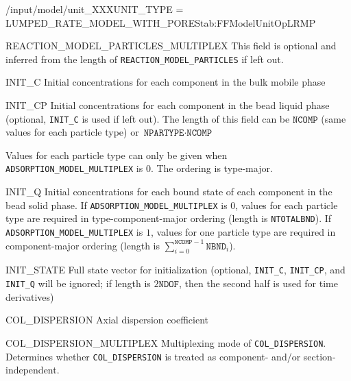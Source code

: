 \begin{condsubgroup}{/input/model/unit\_XXX}{UNIT\_TYPE = LUMPED\_RATE\_MODEL\_WITH\_PORES}{tab:FFModelUnitOpLRMP}
\begin{dataset}[unit=--,type=int,range={$\{0, 1\}$},length={1}]{REACTION\_MODEL\_PARTICLES\_MULTIPLEX}
    This field is optional and inferred from the length of \texttt{REACTION\_MODEL\_PARTICLES} if left out.
  \end{dataset}
  \begin{dataset}[unit=\si{\mol\per\cubic\metre\of{IV}},type=double,range={$\geq 0$},length={\texttt{NCOMP}}]{INIT\_C}
    Initial concentrations for each component in the bulk mobile phase
  \end{dataset}
  \begin{dataset}[unit=\si{\mol\per\cubic\metre\of{MP}},type=double,range={$\geq 0$},length={\texttt{NCOMP} / $\texttt{NPARTYPE} \cdot \texttt{NCOMP}$}]{INIT\_CP}
    Initial concentrations for each component in the bead liquid phase (optional, \texttt{INIT\_C} is used if left out).
    The length of this field can be $\texttt{NCOMP}$ (same values for each particle type) or $\texttt{NPARTYPE} \cdot \texttt{NCOMP}$

    Values for each particle type can only be given when \texttt{ADSORPTION\_MODEL\_MULTIPLEX} is $0$.
    The ordering is type-major.
  \end{dataset}
  \begin{dataset}[unit=\si{\mol\per\cubic\metre\of{SP}},type=double,range={$\geq 0$},length={\texttt{NTOTALBND} / $\sum_{i = 0}^{\texttt{NCOMP} - 1} \texttt{NBND}_i$}]{INIT\_Q}
    Initial concentrations for each bound state of each component in the bead solid phase.
    If \texttt{ADSORPTION\_MODEL\_MULTIPLEX} is $0$, values for each particle type are required in type-component-major ordering (length is \texttt{NTOTALBND}).
    If \texttt{ADSORPTION\_MODEL\_MULTIPLEX} is $1$, values for one particle type are required in component-major ordering (length is $\sum_{i = 0}^{\texttt{NCOMP} - 1} \texttt{NBND}_i$).
  \end{dataset}
  \begin{dataset}[unit=various,type=double,range={$\mathds{R}$},length={\texttt{NDOF} / $2\texttt{NDOF}$}]{INIT\_STATE}
    Full state vector for initialization (optional, \texttt{INIT\_C}, \texttt{INIT\_CP}, and \texttt{INIT\_Q} will be ignored; if length is $2\texttt{NDOF}$, then the second half is used for time derivatives)
  \end{dataset}
  \begin{dataset}[unit=\si{\square\metre\of{IV}\per\second},type=double,range={$\geq 0$},length={see \texttt{COL\_DISPERSION\_MULTIPLEX}}]{COL\_DISPERSION}
    Axial dispersion coefficient
  \end{dataset}
  \begin{dataset}[unit=--,type=int,range={$\{0, \dots, 3 \}$},length={1}]{COL\_DISPERSION\_MULTIPLEX}
    Multiplexing mode of \texttt{COL\_DISPERSION}.
    Determines whether \texttt{COL\_DISPERSION} is treated as component- and/or section-independent.


\end{dataset}
\end{condsubgroup}
